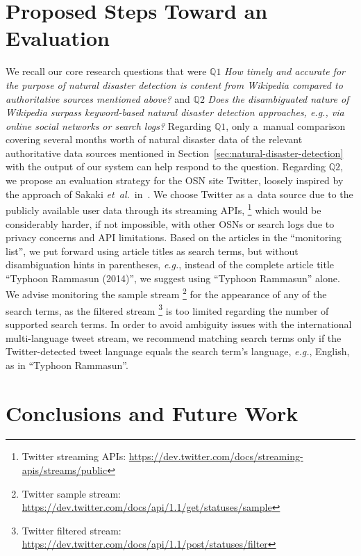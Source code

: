 \documentclass[letterpaper]{article}
\begin{document}
\section{Proposed Steps Toward an Evaluation}

We recall our core research questions that were
$\mathbb{Q}1$ \emph{How timely and accurate for the purpose
of natural disaster detection is content from Wikipedia
compared to authoritative sources mentioned above?} and
$\mathbb{Q}2$ \emph{Does the disambiguated nature of Wikipedia
surpass keyword-based natural disaster detection approaches,
\emph{e.g.}, via online social networks or search logs?}
Regarding $\mathbb{Q}1$, only a~manual comparison
covering several months worth
of natural disaster data of the relevant authoritative data sources
mentioned in Section~\ref{sec:natural-disaster-detection}
with the output of our system can help respond to the question.
Regarding $\mathbb{Q}2$, we propose an evaluation strategy
for the OSN site Twitter,
loosely inspired by the approach of Sakaki \emph{et~al.}\
in~\cite{sakaki2010earthquake}.
We choose Twitter as a~data source due to the publicly available user data
through its streaming APIs,%
\footnote{Twitter streaming APIs:
\url{https://dev.twitter.com/docs/streaming-apis/streams/public}}
which would be considerably harder, if not impossible, with other OSNs or search logs
due to privacy concerns and API limitations.
Based on the articles in the ``monitoring list'',
we put forward using article titles as search terms,
but without disambiguation hints in parentheses,
\emph{e.g.}, instead of the complete article title
``Typhoon Rammasun (2014)'', we suggest using ``Typhoon Rammasun'' alone.
We advise monitoring the sample stream%
\footnote{Twitter sample stream:
\url{https://dev.twitter.com/docs/api/1.1/get/statuses/sample}}
for the appearance of any of the search terms,
as the filtered stream%
\footnote{Twitter filtered stream:
\url{https://dev.twitter.com/docs/api/1.1/post/statuses/filter}}
is too limited regarding the number of supported search terms.
In order to avoid ambiguity issues with the
international multi-language tweet stream,
we recommend matching search terms only
if the Twitter-detected tweet language equals
the search term's language, \emph{e.g.}, English, as in ``Typhoon Rammasun''.


\section{Conclusions and Future Work}
\end{document}
